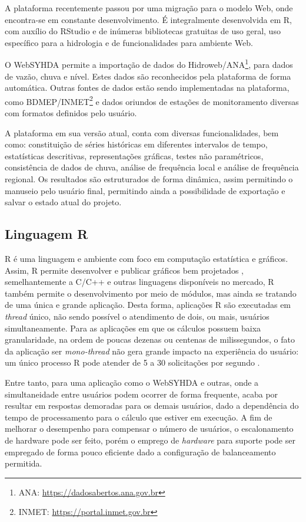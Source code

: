 \documentclass[12pt,english,brazil]{article}
\begin{document}
A plataforma recentemente passou por uma migração para o modelo Web, onde encontra-se em constante desenvolvimento. É integralmente desenvolvida em R, com auxílio do RStudio e de inúmeras bibliotecas gratuitas de uso geral, uso específico para a hidrologia e de funcionalidades para ambiente Web. %

O WebSYHDA permite a importação de dados do Hidroweb/ANA\footnote{ANA: \url{https://dadosabertos.ana.gov.br}}, para dados de vazão, chuva e nível. Estes dados são reconhecidos pela plataforma de forma automática. Outras fontes de dados estão sendo implementadas na plataforma, como BDMEP/INMET\footnote{INMET: \url{https://portal.inmet.gov.br}} e dados oriundos de estações de monitoramento diversas com formatos definidos pelo usuário.

A plataforma em sua versão atual, conta com diversas funcionalidades, bem como: constituição de séries históricas em diferentes intervalos de tempo, estatísticas descritivas, representações gráficas, testes não paramétricos, consistência de dados de chuva, análise de frequência local e análise de frequência regional. Os resultados são estruturados de forma dinâmica, assim permitindo o manuseio pelo usuário final, permitindo ainda a possibilidade de exportação e salvar o estado atual do projeto. 

\subsection{Linguagem R} \label{sec:R}

R é uma linguagem e ambiente com foco em computação estatística e gráficos. Assim, R permite desenvolver e publicar gráficos bem projetados \cite{whatR}, semelhantemente a C/C++ e outras linguagens disponíveis no mercado, R também permite o desenvolvimento por meio de módulos, mas ainda se tratando de uma única e grande aplicação. Desta forma, aplicações R são executadas em \emph{thread} único, não sendo possível o atendimento de dois, ou mais, usuários simultaneamente. Para as aplicações em que os cálculos possuem baixa granularidade, na ordem de poucas dezenas ou centenas de milissegundos, o fato da aplicação ser \emph{mono-thread} não gera grande impacto na experiência do usuário: um único processo R  pode atender de 5 a 30 solicitações por segundo \cite{ShinyappsEscalabilidade}. 

Entre tanto, para uma aplicação como o WebSYHDA e outras, onde a simultaneidade entre usuários podem ocorrer de forma frequente, acaba por resultar em respostas demoradas para os demais usuários, dado a dependência do tempo de processamento para o cálculo que estiver em execução. A fim de melhorar o desempenho para compensar o número de usuários, o escalonamento de hardware pode ser feito, porém o emprego de \emph{hardware} para suporte pode ser empregado de forma pouco eficiente dado a configuração de balanceamento permitida. %
\end{document}
